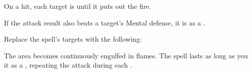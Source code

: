 
On a hit, each target is  until it puts out the fire.







If the attack result also beats a target's Mental defense, it is  as a .









Replace the spell's targets with the following:
\begin{spellcontent}

\begin{augmenttargetinginfo}




\end{augmenttargetinginfo}

\end{spellcontent}






The area becomes continuously engulfed in flames.
The spell lasts as long as you  it as a , repeating the attack during each .









